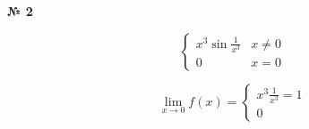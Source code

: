 \documentclass{article}
\begin{document}
\textbf{№ 2} 

\begingroup
\Large
$$ \begin{cases}
      x^3 \sin{\frac{1}{x^3}} & x\neq 0 \\
      0 & x = 0
   \end{cases}$$


$$ \lim\limits_{x \to 0} f(x)
= \begin{cases}
    x^3 \frac{1}{x^3} = 1 \\
    0
  \end{cases}
$$

\endgroup
\end{document}
